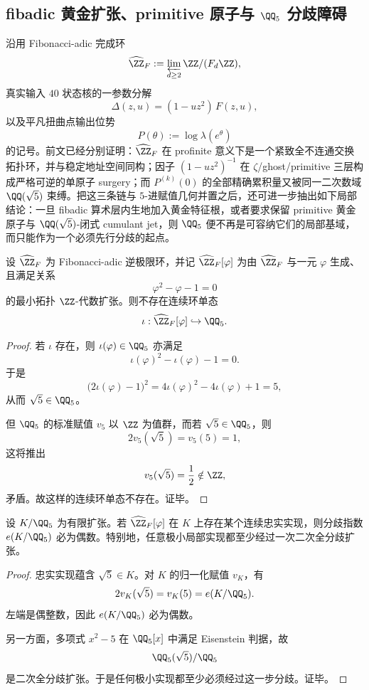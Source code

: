 \subsection{fibadic 黄金扩张、primitive 原子与 \texorpdfstring{$\QQ_5$}{Q5} 分歧障碍}\label{subsec:conclusion-fibadic-golden-q5-ramification-obstruction}
沿用 Fibonacci-adic 完成环
\[
\widehat{\ZZ}_F:=\varprojlim_{d\ge 2}\ZZ/(F_d\ZZ),
\]
真实输入 \(40\) 状态核的一参数分解
\[
\Delta(z,u)=(1-uz^2)\,F(z,u),
\]
以及平凡扭曲点输出位势
\[
P(\theta):=\log\lambda(e^\theta)
\]
的记号。前文已经分别证明：\(\widehat{\ZZ}_F\) 在 profinite 意义下是一个紧致全不连通交换拓扑环，并与稳定地址空间同构；因子 \((1-uz^2)^{-1}\) 在 \(\zeta\)/ghost/primitive 三层构成严格可逆的单原子 surgery；而 \(P^{(k)}(0)\) 的全部精确累积量又被同一二次数域 \(\QQ(\sqrt5)\) 束缚。把这三条链与 \(5\)-进赋值几何并置之后，还可进一步抽出如下局部结论：一旦 fibadic 算术层内生地加入黄金特征根，或者要求保留 primitive 黄金原子与 \(\QQ(\sqrt5)\)-闭式 cumulant jet，则 \(\QQ_5\) 便不再是可容纳它们的局部基域，而只能作为一个必须先行分歧的起点。

\begin{theorem}\label{thm:conclusion-fibadic-golden-extension-no-intrinsic-q5-realization}
设 \(\widehat{\ZZ}_F\) 为 Fibonacci-adic 逆极限环，并记 \(\widehat{\ZZ}_F[\varphi]\) 为由 \(\widehat{\ZZ}_F\) 与一元 \(\varphi\) 生成、且满足关系
\[
\varphi^2-\varphi-1=0
\]
的最小拓扑 \(\ZZ\)-代数扩张。则不存在连续环单态
\[
\iota:\widehat{\ZZ}_F[\varphi]\hookrightarrow \QQ_5.
\]
\end{theorem}
\begin{proof}
若 \(\iota\) 存在，则 \(\iota(\varphi)\in\QQ_5\) 亦满足
\[
\iota(\varphi)^2-\iota(\varphi)-1=0.
\]
于是
\[
\bigl(2\iota(\varphi)-1\bigr)^2
=
4\iota(\varphi)^2-4\iota(\varphi)+1
=
5,
\]
从而 \(\sqrt5\in\QQ_5\)。

但 \(\QQ_5\) 的标准赋值 \(v_5\) 以 \(\ZZ\) 为值群，而若 \(\sqrt5\in\QQ_5\)，则
\[
2v_5(\sqrt5)=v_5(5)=1,
\]
这将推出
\[
v_5(\sqrt5)=\frac12\notin\ZZ,
\]
矛盾。故这样的连续环单态不存在。证毕。
\end{proof}

\begin{corollary}\label{cor:conclusion-fibadic-golden-extension-even-ramification-necessity}
设 \(K/\QQ_5\) 为有限扩张。若 \(\widehat{\ZZ}_F[\varphi]\) 在 \(K\) 上存在某个连续忠实实现，则分歧指数 \(e(K/\QQ_5)\) 必为偶数。特别地，任意极小局部实现都至少经过一次二次全分歧扩张。
\end{corollary}
\begin{proof}
忠实实现蕴含 \(\sqrt5\in K\)。对 \(K\) 的归一化赋值 \(v_K\)，有
\[
2v_K(\sqrt5)=v_K(5)=e(K/\QQ_5).
\]
左端是偶整数，因此 \(e(K/\QQ_5)\) 必为偶数。

另一方面，多项式 \(x^2-5\) 在 \(\QQ_5[x]\) 中满足 Eisenstein 判据，故
\[
\QQ_5(\sqrt5)/\QQ_5
\]
是二次全分歧扩张。于是任何极小实现都至少必须经过这一步分歧。证毕。
\end{proof}

